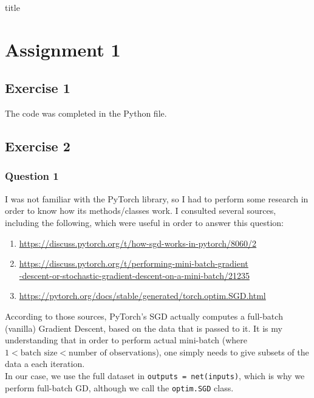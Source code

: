 \documentclass[12pt]{article}
\begin{document}
{title}

\tableofcontents
\listoffigures
\listoftables



\section{Assignment 1}
\subsection{Exercise 1}
The code was completed in the Python file.

\subsection{Exercise 2}
\subsubsection{Question 1}
I was not familiar with the PyTorch library, so I had to perform some research in order to know how its methods/classes work.
I consulted several sources, including the following, which were useful in order to answer this question:
\begin{enumerate}
  \item \href{https://discuss.pytorch.org/t/how-sgd-works-in-pytorch/8060/2}{https://discuss.pytorch.org/t/how-sgd-works-in-pytorch/8060/2}
  \item \href{https://discuss.pytorch.org/t/performing-mini-batch-gradient-descent-or-stochastic-gradient-descent-on-a-mini-batch/21235}{https://discuss.pytorch.org/t/performing-mini-batch-gradient} \\
        \href{https://discuss.pytorch.org/t/performing-mini-batch-gradient-descent-or-stochastic-gradient-descent-on-a-mini-batch/21235}{-descent-or-stochastic-gradient-descent-on-a-mini-batch/21235}

  \item \href{https://pytorch.org/docs/stable/generated/torch.optim.SGD.html}{https://pytorch.org/docs/stable/generated/torch.optim.SGD.html}
\end{enumerate}
According to those sources, PyTorch's SGD actually computes a full-batch (vanilla) Gradient Descent, based on the data that is passed to it.
It is my understanding that in order to perform actual mini-batch (\ie where $1 < \text{batch size} < \text{number of observations}$), one simply needs to give subsets of the data a each iteration. \\
In our case, we use the full dataset in \texttt{outputs = net(inputs)}, which is why we perform full-batch GD, although we call the \texttt{optim.SGD} class.
\end{document}
